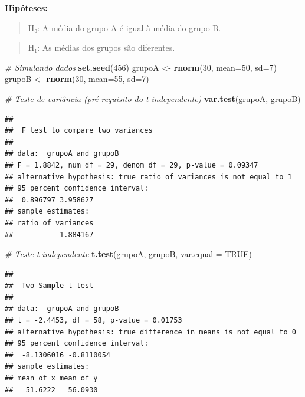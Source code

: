 \documentclass[
]{book}
\newenvironment{Shaded}{\begin{snugshade}}{\end{snugshade}}
\newcommand{\AttributeTok}[1]{\textcolor[rgb]{0.13,0.29,0.53}{#1}}
\newcommand{\CommentTok}[1]{\textcolor[rgb]{0.56,0.35,0.01}{\textit{#1}}}
\newcommand{\ConstantTok}[1]{\textcolor[rgb]{0.56,0.35,0.01}{#1}}
\newcommand{\DecValTok}[1]{\textcolor[rgb]{0.00,0.00,0.81}{#1}}
\newcommand{\FunctionTok}[1]{\textcolor[rgb]{0.13,0.29,0.53}{\textbf{#1}}}
\newcommand{\NormalTok}[1]{#1}
\newcommand{\OtherTok}[1]{\textcolor[rgb]{0.56,0.35,0.01}{#1}}
\begin{document}
\textbf{Hipóteses:}

\begin{quote}
H₀: A média do grupo A é igual à média do grupo B.
\end{quote}

\begin{quote}
H₁: As médias dos grupos são diferentes.
\end{quote}

\begin{Shaded}
\begin{Highlighting}[]
\CommentTok{\# Simulando dados}
\FunctionTok{set.seed}\NormalTok{(}\DecValTok{456}\NormalTok{)}
\NormalTok{grupoA }\OtherTok{\textless{}{-}} \FunctionTok{rnorm}\NormalTok{(}\DecValTok{30}\NormalTok{, }\AttributeTok{mean=}\DecValTok{50}\NormalTok{, }\AttributeTok{sd=}\DecValTok{7}\NormalTok{)}
\NormalTok{grupoB }\OtherTok{\textless{}{-}} \FunctionTok{rnorm}\NormalTok{(}\DecValTok{30}\NormalTok{, }\AttributeTok{mean=}\DecValTok{55}\NormalTok{, }\AttributeTok{sd=}\DecValTok{7}\NormalTok{)}

\CommentTok{\# Teste de variância (pré{-}requisito do t independente)}
\FunctionTok{var.test}\NormalTok{(grupoA, grupoB)}
\end{Highlighting}
\end{Shaded}

\begin{verbatim}
## 
##  F test to compare two variances
## 
## data:  grupoA and grupoB
## F = 1.8842, num df = 29, denom df = 29, p-value = 0.09347
## alternative hypothesis: true ratio of variances is not equal to 1
## 95 percent confidence interval:
##  0.896797 3.958627
## sample estimates:
## ratio of variances 
##           1.884167
\end{verbatim}

\begin{Shaded}
\begin{Highlighting}[]
\CommentTok{\# Teste t independente}
\FunctionTok{t.test}\NormalTok{(grupoA, grupoB, }\AttributeTok{var.equal =} \ConstantTok{TRUE}\NormalTok{)}
\end{Highlighting}
\end{Shaded}

\begin{verbatim}
## 
##  Two Sample t-test
## 
## data:  grupoA and grupoB
## t = -2.4453, df = 58, p-value = 0.01753
## alternative hypothesis: true difference in means is not equal to 0
## 95 percent confidence interval:
##  -8.1306016 -0.8110054
## sample estimates:
## mean of x mean of y 
##   51.6222   56.0930
\end{verbatim}
\end{document}
